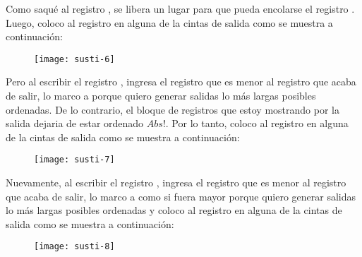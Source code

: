 \documentclass[10pt,a4paper]{article}
\begin{document}
Como saqué al registro , se libera un lugar para que pueda encolarse el registro . Luego, coloco al registro  en alguna de la cintas de salida como se muestra a continuación:  
\newline
\newline
\begin{figure}[h]
	\centering
\texttt{[image: susti-6]}
	\label{drivers1}
\end{figure}
\newline
\newline
Pero al escribir el registro , ingresa el registro  que es menor al registro  que acaba de salir, lo marco a  porque quiero generar salidas lo más largas posibles ordenadas. De lo contrario, el bloque de registros que estoy mostrando por la salida dejaria de estar ordenado  $Abs!$. 
\newline
\newline
Por lo tanto, coloco al registro  en alguna de la cintas de salida como se muestra a continuación:  
\newline
\newline
\begin{figure}[h]
	\centering
\texttt{[image: susti-7]}
	\label{drivers1}
\end{figure}      
\newline
\newline
Nuevamente, al escribir el registro , ingresa el registro  que es menor al registro  que acaba de salir, lo marco a  como si fuera mayor porque quiero generar salidas lo más largas posibles ordenadas y coloco al registro  en alguna de la cintas de salida como se muestra a continuación:
\newline
\newline
\begin{figure}[h]
	\centering
\texttt{[image: susti-8]}
	\label{drivers1}
\end{figure}      
\newpage
\end{document}
